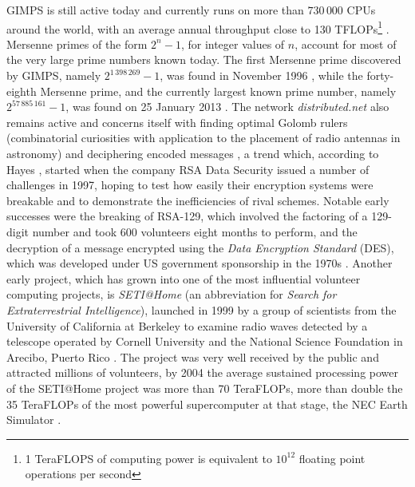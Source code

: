 GIMPS is still active today and currently runs on more than $730\,000$ CPUs around the world, with an average annual throughput close to  130 TFLOPs\footnote{1 TeraFLOPS of computing power is equivalent to $10^{12}$ floating point operations per second} \cite{gimps}. Mersenne primes of the form $2^n-1$, for integer  values of $n$, account for most of the very large prime numbers known today. The first Mersenne prime discovered by GIMPS, namely $2^{1\,398\,269}-1$, was found in November 1996 \cite{hayes}, while the  forty-eighth Mersenne prime, and the currently largest known prime number, namely $2^{57\,885\,161} -1$, was   found on 25 January 2013 \cite{gimps}. 
The network \textsl{distributed.net} also remains active   and concerns itself with finding optimal Golomb rulers (combinatorial curiosities with application to the placement of radio antennas in astronomy) and deciphering encoded messages \cite{distnet}, a trend which, according to Hayes \cite{hayes}, started when the company RSA Data Security  issued a number of challenges in 1997, hoping to test how easily their encryption systems were breakable and to demonstrate the inefficiencies of rival schemes. Notable early successes were the breaking of RSA-129, which involved the factoring of a 129-digit number   and  took 600 volunteers eight months to perform, and the decryption of a message encrypted using the \emph{Data Encryption Standard} (DES), which was developed under US government sponsorship in the 1970s \cite{distnet}. 
Another early project, which has grown into one of the most influential volunteer computing projects, is  \emph{SETI@Home} (an abbreviation for \emph{Search for Extraterrestrial Intelligence}), launched  in 1999 by a group of scientists from the University of California at Berkeley to examine radio waves detected by a telescope operated by Cornell University and the National Science Foundation in Arecibo, Puerto Rico \cite{anderson:seti2002}. The project was very well received by the public and attracted millions of volunteers, by 2004 the average sustained processing power of the SETI@Home project was more than 70 TeraFLOPs, more than double the 35 TeraFLOPs of the most powerful supercomputer at that stage, the NEC Earth Simulator \cite{anderson2004boinc}.
 
